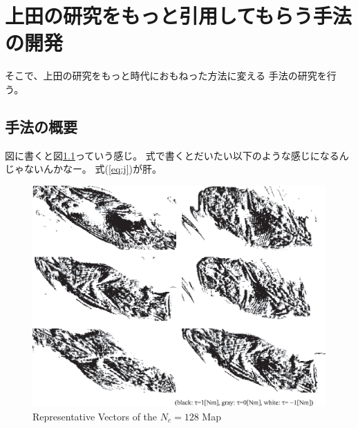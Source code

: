 \chapter{上田の研究をもっと引用してもらう手法の開発}\label{chap:method}

そこで、上田の研究をもっと時代におもねった方法に変える
手法の研究を行う。


\section{手法の概要}

図に書くと図\ref{fig:vq_map_128part}っていう感じ。
式で書くとだいたい以下のような感じになるんじゃないんかなー。
式(\ref{eq:j})が肝。

\begin{figure}[h]
        \begin{center}
        \includegraphics[width=1.0\linewidth]{figs/vq_map_128part.eps}
        \caption{Representative Vectors of the $N_c = 128$ Map}
        \label{fig:vq_map_128part}
        \end{center}
\end{figure}




